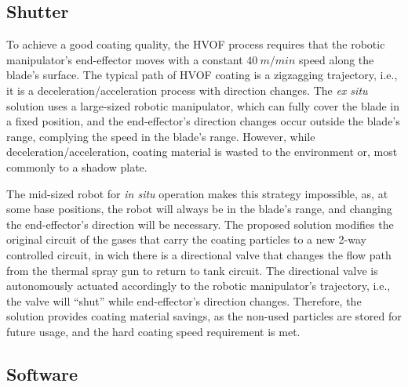 \subsection{Shutter}

To achieve a good coating quality, the HVOF process requires that the robotic
manipulator's end-effector moves with a constant $40~m/min$ speed along the
blade's surface. The typical path of HVOF coating is a zigzagging trajectory,
i.e., it is a deceleration/acceleration process with direction changes. The
\textit{ex situ} solution uses a large-sized robotic manipulator, which can
fully cover the blade in a fixed position, and the end-effector's direction
changes occur outside the blade's range, complying the speed in the blade's
range. However, while deceleration/acceleration, coating material is wasted to
the environment or, most commonly to a shadow plate.

The mid-sized robot for \textit{in situ} operation makes this strategy
impossible, as, at some base positions, the robot will always be in the blade's
range, and changing the end-effector's direction will be necessary. The proposed
solution modifies the original circuit of the gases that carry the coating
particles to a new 2-way controlled circuit, in wich there is a directional
valve that changes the flow path from the thermal spray gun to return to tank
circuit. %
The directional valve is autonomously actuated accordingly to the robotic
manipulator's trajectory, i.e., the valve will ``shut'' while end-effector's
direction changes. Therefore, the solution provides coating material savings,
as the non-used particles are stored for future usage, and the hard coating
speed requirement is met.


\subsection{Software}